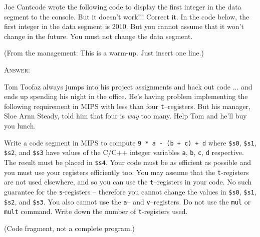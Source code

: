 \begin{itemize}
\begin{answercode}
  \end{answercode}
\end{itemize}

\newpage
\nextq
Joe Cantcode wrote the following code to display the first
integer in the data segment 
to the
console.
But it doesn't work!!! Correct it.
In the code below, the first integer in the data segment is 2010.
But you cannot assume that it won't change in the future.
You must not change the data segment.

(From the management: This is a warm-up. Just insert one line.)

\textsc{Answer:}

\newpage
\nextq
Tom Toofaz always jumps into his project assignments and hack out code ... and
ends up spending his night in the office.
He's having problem implementing the following requirement
in MIPS with less than four \verb!t!--registers.
But his manager, Sloe Arnn Steady, told him that four is \textit{way} too many.
Help Tom and he'll buy you lunch.

Write a code segment in MIPS to compute
\verb!9 * a - (b + c) + d! where
\verb!$s0!, \verb!$s1!, \verb!$s2!, and
\verb!$s3! have values of the C/C++ integer variables
\verb!a!, \verb!b!, \verb!c!, \verb!d! respective.
The result must be placed in \verb!$s4!.
Your code must be as efficient as possible and you must use your registers
efficiently too.
You may assume that the \verb!t!-registers are not used elsewhere, and so you
can use the \verb!t!--registers in your code.
No such guarantee for the \verb!s!-registers -- therefore
you cannot change the values in
\verb!$s0!, \verb!$s1!, \verb!$s2!, and \verb!$s3!.
You also cannot use the \verb!a!-- and \verb!v!--registers.
Do not use the \verb!mul! or \verb!mult! command.
Write down the number of \verb!t!-registers used.
\\
\ANSWER
\begin{answercode}

\end{answercode}
\vspace{-4mm}
(Code fragment, not a complete program.)

